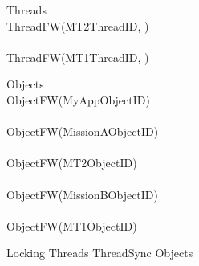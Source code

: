 %
\begin{circus}
\circprocess Threads \circdef  \\
\circblockopen
ThreadFW(MT2ThreadID, ) \\
\interleave \\
ThreadFW(MT1ThreadID, ) \\

\circblockclose
\end{circus}
%
%
\begin{circus}
\circprocess Objects \circdef \\
\circblockopen
ObjectFW(MyAppObjectID) \\
\interleave \\
ObjectFW(MissionAObjectID) \\
\interleave \\
ObjectFW(MT2ObjectID) \\
\interleave \\
ObjectFW(MissionBObjectID) \\
\interleave \\
ObjectFW(MT1ObjectID) \\

\circblockclose
\end{circus}
%
%
\begin{circus}
\circprocess Locking \circdef Threads \lpar ThreadSync \rpar Objects
\end{circus}
